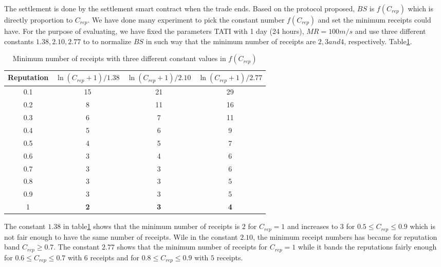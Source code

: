 \documentclass[letterpaper, 10 pt, conference]{ieeeconf}  %
\newcommand{\crep}{\ensuremath{C_{\mathit{rep}} }}
\begin{document}
The settlement is done by the settlement smart contract when the trade ends. Based on the protocol proposed, $BS$ is $f(C_{rep})$ which is directly proportion to $C_{rep}$. We have done many experiment to pick the constant number $f(C_{rep})$ and set the minimum receipts could have. For the purpose of evaluating, we have fixed the parameters TATI with 1 day (24 hours), $MR = 100 m/s $ and use three different constants $1.38, 2.10, 2.77$ to to normalize $BS$ in such way that the minimum number of receipts are $2,3 and 4$, respectively. Table\ref{ReceiptNumber}.


\begin{table}[h]
\caption{Minimum number of receipts with three different constant values in $f(C_{rep})$}
\label{ReceiptNumber}
\begin{adjustbox}{width=0.48\textwidth}
\begin{tabular}{|c||c||c||c|}
\hline
\textbf{Reputation} &\textbf{$\ln(\crep + 1)/1.38$} & \textbf{$\ln(\crep + 1)/2.10$} & \textbf{$\ln(\crep + 1)/2.77$} \\

\hline
0.1  & 15 & 21 & 29 \\

\hline
0.2  & 8 & 11 & 16 \\

\hline
0.3  & 6 & 7 & 11 \\

\hline
0.4  & 5 & 6 & 9 \\

\hline
0.5  & 4 & 5 & 7 \\

\hline
0.6  & 3 & 4 & 6 \\

\hline
0.7  & 3 & 3 & 6 \\

\hline
0.8  & 3 & 3 & 5 \\

\hline
0.9  & 3 & 3 & 5 \\

\hline
1  & \textbf{2} & \textbf{3} & \textbf{4}  \\

\hline
\end{tabular}
\end{adjustbox}
\end{table}


 The constant $1.38$ in table\ref{ReceiptNumber} shows that the minimum number of receipts is $2$ for $C_{rep} = 1$ and increases to $3$ for $0.5 \leq C_{rep} \leq 0.9$  which is not fair enough to have the same number of receipts. Wile in the constant $2.10$, the minimum receipt numbers has became for reputation band  $C_{rep} \geq 0.7$. The constant $2.77$ shows that the minimum number of receipts for $C_{rep} = 1$ while it bands the reputations fairly enough for $0.6 \leq C_{rep} \leq 0.7$ with $6$ receipts and for $0.8 \leq C_{rep} \leq 0.9$ with $5$ receipts.
 
\end{document}
